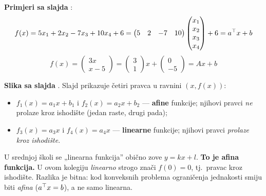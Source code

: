 \textbf{Primjeri sa slajda} :
\[
f(x) = 5x_1 + 2x_2 - 7x_3 + 10x_4 + 6
= \begin{pmatrix} 5 & 2 & -7 & 10 \end{pmatrix}
  \begin{pmatrix} x_1 \\ x_2 \\ x_3 \\ x_4 \end{pmatrix} + 6
= a^{\top} x + b
\]
\[
f(x) = \begin{pmatrix} 3x \\ x - 5 \end{pmatrix}
= \begin{pmatrix} 3 \\ 1 \end{pmatrix} x + \begin{pmatrix} 0 \\ -5 \end{pmatrix}
= Ax + b
\]

\textbf{Slika sa slajda} . Slajd prikazuje četiri pravca u ravnini
$(x, f(x))$:

\begin{itemize}
  \item $f_1(x) = a_1x + b_1$ i $f_2(x) = a_2x + b_2$ --- \textbf{afine}
        funkcije; njihovi pravci \emph{ne} prolaze kroz ishodište (jedan raste,
        drugi pada);
  \item $f_3(x) = a_3x$ i $f_4(x) = a_4x$ --- \textbf{linearne} funkcije;
        njihovi pravci \emph{prolaze kroz ishodište}.
\end{itemize}

\begin{napomena}
U srednjoj školi se „linearna funkcija” obično zove $y = kx + l$. \textbf{To je
afina funkcija.} U ovom kolegiju \emph{linearno} strogo znači $f(0)=0$, tj.\
pravac kroz ishodište. Razlika je bitna: kod konveksnih problema ograničenja
jednakosti smiju biti \emph{afina} ($a^{\top} x = b$), a ne samo linearna.
\end{napomena}

